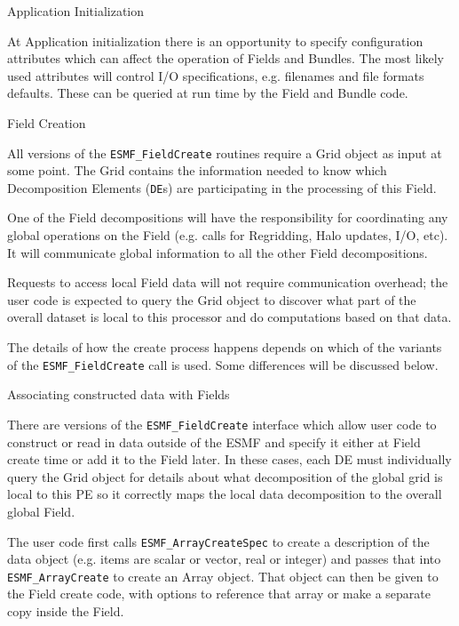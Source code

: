 \begin{description}

\item{Application Initialization}
 
At Application initialization there is an opportunity to 
specify configuration attributes which can affect the
operation of Fields and Bundles.  The most likely used
attributes will control I/O specifications, e.g. 
filenames and file formats defaults.  These can be
queried at run time by the Field and Bundle code.

\item{Field Creation}

All versions of the {\tt ESMF\_FieldCreate} 
routines require a Grid object as input at some point.
The Grid contains the information needed to know which 
Decomposition Elements ({\tt DE}s) are participating in 
the processing of this Field.  

One of the Field decompositions
will have the responsibility for coordinating
any global operations on the Field (e.g. calls for Regridding,
Halo updates, I/O, etc).  It will communicate global information
to all the other Field decompositions.

Requests to access local Field data will not require 
communication overhead; the user code is expected to
query the Grid object to discover what part of the
overall dataset is local to this processor and do
computations based on that data.

The details of how the create process happens depends 
on which of the 
variants of the {\tt ESMF\_FieldCreate} call is used.
Some differences will be discussed below.

\item{Associating constructed data with Fields}

There are versions of the {\tt ESMF\_FieldCreate} interface
which allow user code to construct or read in data
outside of the ESMF and specify it either at Field create
time or add it to the Field later.  
In these cases, each DE must individually query the Grid object 
for details about what decomposition of the global grid is local 
to this PE so it correctly maps the local data decomposition
to the overall global Field.

The user code first calls 
{\tt ESMF\_ArrayCreateSpec} to create a
description of the data object (e.g. items are scalar or vector,
real or integer) and passes that into {\tt ESMF\_ArrayCreate}
to create an Array object.  That object can then be given
to the Field create code, with options to reference that array
or make a separate copy inside the Field. 


\end{description}
